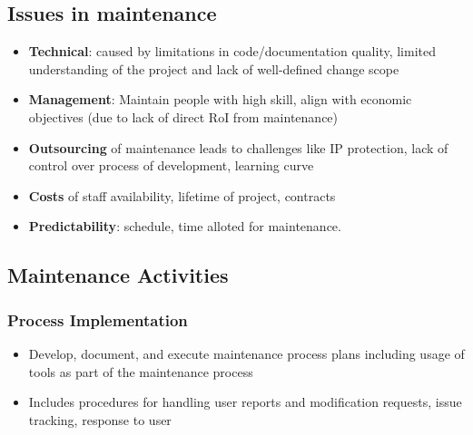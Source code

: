 \documentclass{article}
\begin{document}
\subsection{Issues in maintenance}
\begin{itemize}
    \item \textbf{Technical}: caused by limitations in code/documentation quality, limited understanding of the project and lack of well-defined change scope 
    
    \item \textbf{Management}: Maintain people with high skill, align with economic objectives (due to lack of direct RoI from maintenance)
    
    \item \textbf{Outsourcing} of maintenance leads to challenges like IP protection, lack of control over process of development, learning curve
    
    \item \textbf{Costs} of staff availability, lifetime of project, contracts 
    
    \item \textbf{Predictability}: schedule, time alloted for maintenance.
\end{itemize}

\subsection{Maintenance Activities}
\subsubsection{Process Implementation}
\begin{itemize}
    \item Develop, document, and execute maintenance process plans including usage of tools as part of the maintenance process 
    
    \item Includes procedures for handling user reports and modification requests, issue tracking, response to user
\end{itemize}
\end{document}

